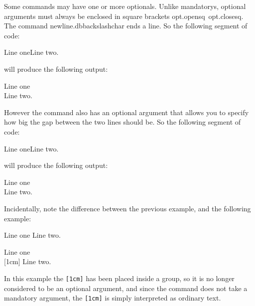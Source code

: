 Some \glspl{command} may have one or more \glspl*{optional}. Unlike
\glspl{mandatory}, optional arguments must always be enclosed in
square brackets \gls{opt.opensq}~\gls{opt.closesq}.
The command \gls{newline.dbbackslashchar} ends a line.
So the following segment of code:
\begin{codeS}
Line oneLine two.
\end{codeS}%
will produce the following output:
\begin{result}\setlength{\parindent}{1.5em}%
Line one\\Line two.
\end{result}%
However the  command also
has an optional
argument that allows you to specify how big the gap between the two
lines should be. So the following segment of code:
\begin{codeS}
Line one\oarg{1cm}Line two.
\end{codeS}%
will produce the following output:
\begin{result}\setlength{\parindent}{1.5em}%
Line one\\[1cm]Line two.
\end{result}
Incidentally, note the
difference between the previous example, and the following example:
\begin{codeS}
Line one\marg{[1cm]} Line two.
\end{codeS}\screenpagebreak
\begin{result}\setlength{\parindent}{1.5em}%
Line one\\{[1cm]} Line two.
\end{result}%
In this example the \texttt{[1cm]} has been placed inside a group, so
it is no longer considered to be an optional argument, and since the
command  does not take a
mandatory argument,
the \texttt{[1cm]} is simply interpreted as ordinary text.

